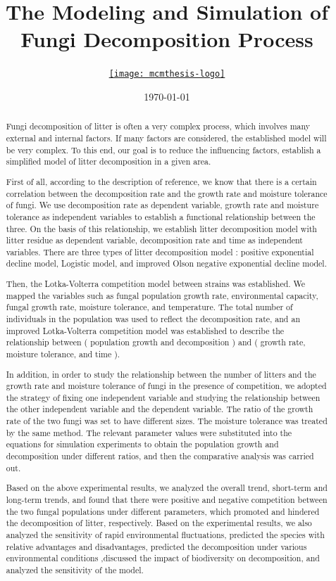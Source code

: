 \documentclass{mcmthesis}
\title{The Modeling and Simulation of Fungi Decomposition Process}
\author{\small \href{2101675}
  {\texttt{[image: mcmthesis-logo]}}}
\date{\today}
\begin{document}
\begin{abstract}

Fungi decomposition of litter is often a very complex process, which involves many external and internal factors. If many factors are considered, the established model will be very complex. To this end, our goal is to reduce the influencing factors, establish a simplified model of litter decomposition in a given area. 

First of all, according to the description of reference, we know that there is a certain correlation between the decomposition rate and the growth rate and moisture tolerance of fungi. We use decomposition rate as dependent variable, growth rate and moisture tolerance as independent variables to establish a functional relationship between the three. On the basis of this relationship, we establish litter decomposition model with litter residue as dependent variable, decomposition rate and time as independent variables. There are three types of litter decomposition model : positive exponential decline model, Logistic model, and improved Olson negative exponential decline model.

Then, the Lotka-Volterra competition model between strains was established. We mapped the variables such as fungal population growth rate, environmental capacity, fungal growth rate, moisture tolerance, and temperature. The total number of individuals in the population was used to reflect the decomposition rate, and an improved Lotka-Volterra competition model was established to describe the relationship between ( population growth and decomposition ) and ( growth rate, moisture tolerance, and time ). 

In addition, in order to study the relationship between the number of litters and the growth rate and moisture tolerance of fungi in the presence of competition, we adopted the strategy of fixing one independent variable and studying the relationship between the other independent variable and the dependent variable. The ratio of the growth rate of the two fungi was set to have different sizes. The moisture tolerance was treated by the same method. The relevant parameter values were substituted into the equations for simulation experiments to obtain the population growth and decomposition under different ratios, and then the comparative analysis was carried out.

Based on the above experimental results, we analyzed the overall trend, short-term and long-term trends, and found that there were positive and negative competition between the two fungal populations under different parameters, which promoted and hindered the decomposition of litter, respectively. Based on the experimental results, we also analyzed the sensitivity of rapid environmental fluctuations, predicted the species with relative advantages and disadvantages, predicted the decomposition under various environmental conditions ,discussed the impact of biodiversity on decomposition, and analyzed the sensitivity of the model.


\end{abstract}
\end{document}
